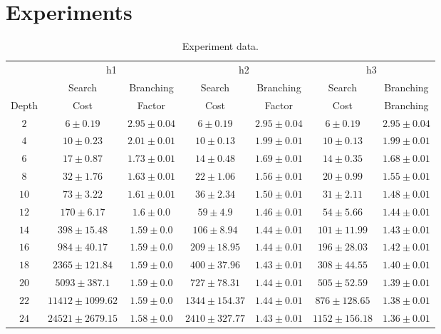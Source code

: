 
\section{Experiments}
\label{sec:expts}

\begin{table*}[t]
  \centering
  \begin{tabular}{|c|cc|cc|cc|}
    \hline \hline %
    & \multicolumn{2}{c|}{h1} & \multicolumn{2}{c|}{h2} & \multicolumn{2}{c|}{h3} \\
    & Search & Branching & Search & Branching & Search & Branching \\
    Depth & Cost & Factor & Cost & Factor & Cost & Branching \\
    \hline %
    $2$ & $6\pm0.19$ & $2.95\pm0.04$ & $6\pm0.19$ & $2.95\pm0.04$ & $6\pm0.19$ & $2.95\pm0.04$ \\
    $4$ & $10\pm0.23$ & $2.01\pm0.01$ & $10\pm0.13$ & $1.99\pm0.01$ & $10\pm0.13$ & $1.99\pm0.01$ \\
    $6$ & $17\pm0.87$ & $1.73\pm0.01$ & $14\pm0.48$ & $1.69\pm0.01$ & $14\pm0.35$ & $1.68\pm0.01$ \\
    $8$ & $32\pm1.76$ & $1.63\pm0.01$ & $22\pm1.06$ & $1.56\pm0.01$ & $20\pm0.99$ & $1.55\pm0.01$ \\
    $10$ & $73\pm3.22$ & $1.61\pm0.01$ & $36\pm2.34$ & $1.50\pm0.01$ & $31\pm2.11$ & $1.48\pm0.01$ \\
    $12$ & $170\pm6.17$ & $1.6\pm0.0$ & $59\pm4.9$ & $1.46\pm0.01$ & $54\pm5.66$ & $1.44\pm0.01$ \\
    $14$ & $398\pm15.48$ & $1.59\pm0.0$ & $106\pm8.94$ & $1.44\pm0.01$ & $101\pm11.99$ & $1.43\pm0.01$ \\
    $16$ & $984\pm40.17$ & $1.59\pm0.0$ & $209\pm18.95$ & $1.44\pm0.01$ & $196\pm28.03$ & $1.42\pm0.01$ \\
    $18$ & $2365\pm121.84$ & $1.59\pm0.0$ & $400\pm37.96$ & $1.43\pm0.01$ & $308\pm44.55$ & $1.40\pm0.01$ \\
    $20$ & $5093\pm387.1$ & $1.59\pm0.0$ & $727\pm78.31$ & $1.44\pm0.01$ & $505\pm52.59$ & $1.39\pm0.01$ \\
    $22$ & $11412\pm1099.62$ & $1.59\pm0.0$ & $1344\pm154.37$ & $1.44\pm0.01$ & $876\pm128.65$ & $1.38\pm0.01$ \\
    $24$ & $24521\pm2679.15$ & $1.58\pm0.0$ & $2410\pm327.77$ & $1.43\pm0.01$ & $1152\pm156.18$ & $1.36\pm0.01$ \\        

    \hline \hline
  \end{tabular}
  
  \caption{Experiment data.}
  \label{tab:data}
\end{table*}

